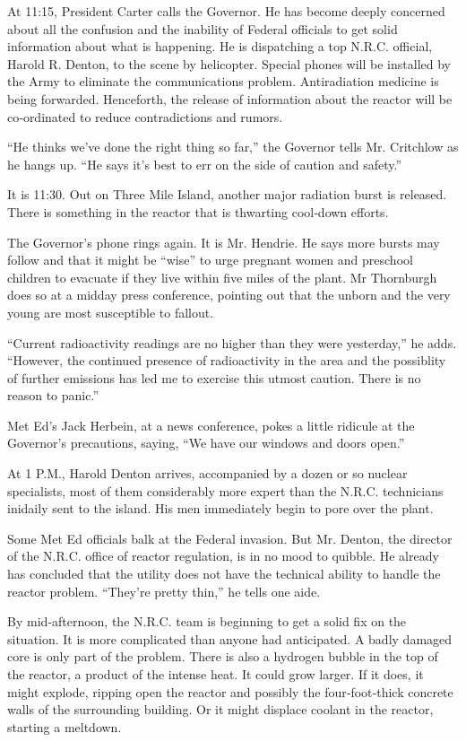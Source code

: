 At 11:15, President Carter calls the Governor. He has become deeply
concerned about all the confusion and the inability of Federal officials
to get solid information about what is happening. He is dispatching a
top N.R.C. official, Harold R. Denton, to the scene by helicopter.
Special phones will be installed by the Army to eliminate the
communications problem. Antiradiation medicine is being forwarded.
Henceforth, the release of information about the reactor will be
co‐ordinated to reduce contradictions and rumors.

``He thinks we've done the right thing so far,'' the Governor tells Mr.
Critchlow as he hangs up. ``He says it's best to err on the side of
caution and safety.''

It is 11:30. Out on Three Mile Island, another major radiation burst is
released. There is something in the reactor that is thwarting cool‐down
efforts.

The Governor's phone rings again. It is Mr. Hendrie. He says more bursts
may follow and that it might be ``wise'' to urge pregnant women and
preschool children to evacuate if they live within five miles of the
plant. Mr Thornburgh does so at a midday press conference, pointing out
that the unborn and the very young are most susceptible to fallout.

``Current radioactivity readings are no higher than they were
yesterday,'' he adds. ``However, the continued presence of radioactivity
in the area and the possiblity of further emissions has led me to
exercise this utmost caution. There is no reason to panic.''

Met Ed's Jack Herbein, at a news conference, pokes a little ridicule at
the Governor's precautions, saying, ``We have our windows and doors
open.''

At 1 P.M., Harold Denton arrives, accompanied by a dozen or so nuclear
specialists, most of them considerably more expert than the N.R.C.
technicians inidaily sent to the island. His men immediately begin to
pore over the plant.

Some Met Ed officials balk at the Federal invasion. But Mr. Denton, the
director of the N.R.C. office of reactor regulation, is in no mood to
quibble. He already has concluded that the utility does not have the
technical ability to handle the reactor problem. ``They're pretty
thin,'' he tells one aide.

By mid‐afternoon, the N.R.C. team is beginning to get a solid fix on the
situation. It is more complicated than anyone had anticipated. A badly
damaged core is only part of the problem. There is also a hydrogen
bubble in the top of the reactor, a product of the intense heat. It
could grow larger. If it does, it might explode, ripping open the
reactor and possibly the four‐foot‐thick concrete walls of the
surrounding building. Or it might displace coolant in the reactor,
starting a meltdown.


